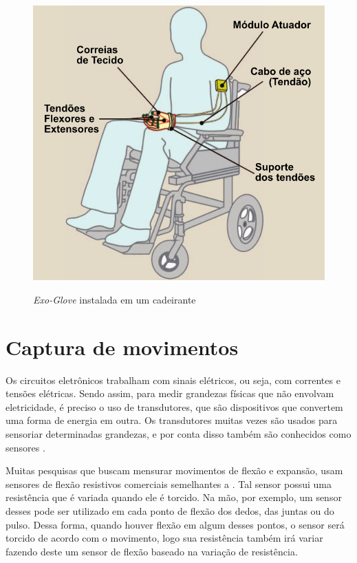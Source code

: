 \documentclass[
	12pt,				%
	openright,			%
	oneside,			%
	a4paper,			%
	english,			%
	brazil				%
	]{abntex2}
\begin{document}
		\begin{figure}[h!]
			\centering
			\caption{\textit{Exo-Glove} instalada em um cadeirante}
  		\includegraphics[scale=0.5]{./figures/exo-glove-installed1.png}
  		\label{Fig:exo-glove-installed1}
		\end{figure}
		
		\section{Captura de movimentos}



		Os circuitos eletrônicos trabalham com sinais elétricos, ou seja, com correntes e tensões elétricas. Sendo assim, para medir grandezas físicas que não envolvam eletricidade, é preciso o uso de transdutores, que são dispositivos que convertem uma forma de energia em outra. Os transdutores muitas vezes são usados para sensoriar determinadas grandezas, e por conta disso também são conhecidos como sensores \cite{ncb2012eletronicabasica}.

		Muitas pesquisas que buscam mensurar movimentos de flexão e expansão, usam sensores de flexão resistivos comerciais semelhantes a \cite{flexsensor}. Tal sensor possui uma resistência que é variada quando ele é torcido. Na mão, por exemplo, um sensor desses pode ser utilizado em cada ponto de flexão dos dedos, das juntas ou do pulso. Dessa forma, quando houver flexão em algum desses pontos, o sensor será torcido de acordo com o movimento, logo sua resistência também irá variar fazendo deste um sensor de flexão baseado na variação de resistência. 
		
\end{document}
